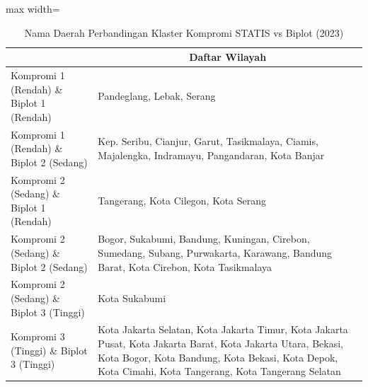 \begin{table}[H]
\centering
\caption{Nama Daerah Perbandingan Klaster Kompromi STATIS vs Biplot (2023)} \label{tab:app1biplot_comp_name_2023}
\begin{adjustbox}{max width=\textwidth}
\begin{tabular}{|>{\centering\arraybackslash}p{4cm}|p{10cm}|}
\hline
\multicolumn{1}{|c|}{\textbf{Kategori}} & \multicolumn{1}{c|}{\textbf{Daftar Wilayah}} \\
\hline
Kompromi 1 (Rendah) \& Biplot 1 (Rendah) & Pandeglang, Lebak, Serang \\
\hline
Kompromi 1 (Rendah) \& Biplot 2 (Sedang) & Kep. Seribu, Cianjur, Garut, Tasikmalaya, Ciamis, Majalengka, Indramayu, Pangandaran, Kota Banjar \\
\hline
Kompromi 2 (Sedang) \& Biplot 1 (Rendah) & Tangerang, Kota Cilegon, Kota Serang \\
\hline
Kompromi 2 (Sedang) \& Biplot 2 (Sedang) & Bogor, Sukabumi, Bandung, Kuningan, Cirebon, Sumedang, Subang, Purwakarta, Karawang, Bandung Barat, Kota Cirebon, Kota Tasikmalaya \\
\hline
Kompromi 2 (Sedang) \& Biplot 3 (Tinggi) & Kota Sukabumi \\
\hline
Kompromi 3 (Tinggi) \& Biplot 3 (Tinggi) & Kota Jakarta Selatan, Kota Jakarta Timur, Kota Jakarta Pusat, Kota Jakarta Barat, Kota Jakarta Utara, Bekasi, Kota Bogor, Kota Bandung, Kota Bekasi, Kota Depok, Kota Cimahi, Kota Tangerang, Kota Tangerang Selatan \\
\hline
\end{tabular}
\end{adjustbox}
\end{table}